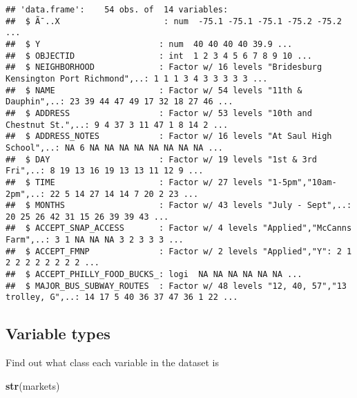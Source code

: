 \documentclass[]{article}
\newenvironment{Shaded}{\begin{snugshade}}{\end{snugshade}}
\newcommand{\KeywordTok}[1]{\textcolor[rgb]{0.13,0.29,0.53}{\textbf{#1}}}
\newcommand{\NormalTok}[1]{#1}
\begin{document}
\begin{verbatim}
## 'data.frame':    54 obs. of  14 variables:
##  $ Ã¯..X                     : num  -75.1 -75.1 -75.1 -75.2 -75.2 ...
##  $ Y                        : num  40 40 40 40 39.9 ...
##  $ OBJECTID                 : int  1 2 3 4 5 6 7 8 9 10 ...
##  $ NEIGHBORHOOD             : Factor w/ 16 levels "Bridesburg Kensington Port Richmond",..: 1 1 1 3 4 3 3 3 3 3 ...
##  $ NAME                     : Factor w/ 54 levels "11th & Dauphin",..: 23 39 44 47 49 17 32 18 27 46 ...
##  $ ADDRESS                  : Factor w/ 53 levels "10th and Chestnut St.",..: 9 4 37 3 11 47 1 8 14 2 ...
##  $ ADDRESS_NOTES            : Factor w/ 16 levels "At Saul High School",..: NA 6 NA NA NA NA NA NA NA NA ...
##  $ DAY                      : Factor w/ 19 levels "1st & 3rd Fri",..: 8 19 13 16 19 13 13 11 12 9 ...
##  $ TIME                     : Factor w/ 27 levels "1-5pm","10am-2pm",..: 22 5 14 27 14 14 7 20 2 23 ...
##  $ MONTHS                   : Factor w/ 43 levels "July - Sept",..: 20 25 26 42 31 15 26 39 39 43 ...
##  $ ACCEPT_SNAP_ACCESS       : Factor w/ 4 levels "Applied","McCanns Farm",..: 3 1 NA NA NA 3 2 3 3 3 ...
##  $ ACCEPT_FMNP              : Factor w/ 2 levels "Applied","Y": 2 1 2 2 2 2 2 2 2 2 ...
##  $ ACCEPT_PHILLY_FOOD_BUCKS_: logi  NA NA NA NA NA NA ...
##  $ MAJOR_BUS_SUBWAY_ROUTES  : Factor w/ 48 levels "12, 40, 57","13 trolley, G",..: 14 17 5 40 36 37 47 36 1 22 ...
\end{verbatim}

\subsection{Variable types}\label{variable-types}

Find out what class each variable in the dataset is

\begin{Shaded}
\begin{Highlighting}[]
\KeywordTok{str}\NormalTok{(markets)}
\end{Highlighting}
\end{Shaded}
\end{document}
